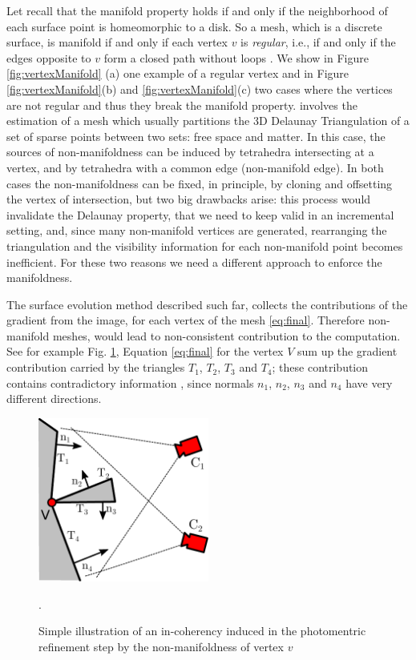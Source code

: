 Let recall that the manifold property holds if and only if the neighborhood of each surface point is homeomorphic to a disk. 
So a mesh, which is a discrete surface, is manifold if and only if each vertex $v$ is \emph{regular}, i.e., if and only if the edges opposite to $v$ form a closed path without loops  \cite{litvinov_lhuillier_13}. 
We show in Figure \ref{fig:vertexManifold} (a) one example of a regular vertex and in Figure \ref{fig:vertexManifold}(b) and \ref{fig:vertexManifold}(c) two cases where the vertices are not regular and thus they break the manifold property.
involves the estimation of a mesh which usually partitions the 3D Delaunay Triangulation of a set of sparse points between two sets: free space and matter.
In this case, the sources of non-manifoldness can be induced by tetrahedra intersecting at a vertex, and by tetrahedra with a common edge (non-manifold edge). 
In both cases the non-manifoldness can be fixed, in principle, by cloning and offsetting the vertex of intersection, but two big drawbacks arise: this process would invalidate the Delaunay property, that we need to keep valid in an incremental setting, and, since many non-manifold vertices are generated, rearranging the triangulation and the visibility information for each non-manifold point becomes inefficient. For these two reasons we need a different approach to enforce the manifoldness.

The surface evolution method described such far, collects the contributions of the gradient from the image, for each vertex of the mesh \eqref{eq:final}. Therefore non-manifold meshes, would lead to non-consistent contribution to the computation. See for example Fig. \ref{fig:whymanifold}, Equation \eqref{eq:final} for the vertex $V$ sum up the gradient contribution carried by the triangles $T_1$, $T_2$, $T_3$ and $T_4$; these contribution contains contradictory information , since normals $n_1$, $n_2$, $n_3$ and $n_4$ have very different directions.

\begin{figure}[t]
\centering
\includegraphics[width=0.5\textwidth]{./img/ch-incr-dens/whymanifold}
\label{fig:whymanifold}
\caption{Simple illustration of an in-coherency induced in the photomentric refinement step by the non-manifoldness of vertex $v$}.
\end{figure}


